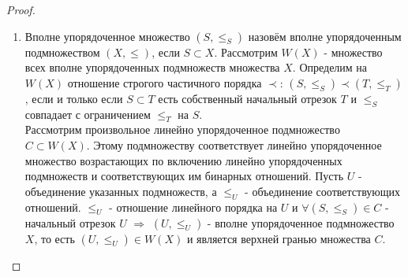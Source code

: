 \documentclass[a4paper, 12pt]{article}
\renewcommand{\phi}{\varphi}
\theoremstyle{definition}
\theoremstyle{plain}
\theoremstyle{remark}
\begin{document}
\begin{proof}
\begin{enumerate}
\begin{proof}
\begin{enumerate}
          \item Пусть $\Sigma$ - семейство корректных множеств и $U=\bigcup\Sigma$. Множество $(U,\leqslant)$ линейно упорядочено по предыдущему пункту. Каждое $S\in\Sigma$ - начальный отрезок $U$. Иначе $\exists x\in S$ и $\exists y\leqslant x$ такой, что $y\in (U\setminus S)$. Тогда для некоторого корректного $T\in\Sigma$ $y\in (T\setminus S)$, значит, $T$ не является начальным отрезком $S$. Тогда по первому утверждению $S$ - начальный отрезок $T$. Противоречие с тем, что $y\leqslant x\in S$ и $y\notin S$.\\
          Докажем, что $(U,\leqslant)$ вполне упорядочено. Пусть $Y\subset U$ не пусто, рассмотрим $y\in Y$ и корректное множество $S\in\Sigma$ такое, что $y\in S$. Поскольку $Y\cap S$ не пусто и вполне упорядочено как подмножество $S$, тогда $\exists x=\min\limits_S(Y\cap S)\in S$. Поскольку $S$ - начальный отрезок $U$, тогда $x$ - наименьший элемент $Y\subset U$.\\
          Выберем $S\in\Sigma$ такое, что $x\in S$. Так как $S$ - начальный отрезок $U$, то $U_x=S_x$ $\Longrightarrow$ $x=\phi(S_x)\phi(U_x)$. По определению $S$ корректно. Лемма доказана. 
        \end{enumerate}
      \end{proof}
      Рассмотрим множество $\Sigma$ всех корректных подмножеств множества $X$ и положим $U=\bigcup\Sigma$. По лемме $U$ вполне упорядочено и, в частности, является линейно упорядоченным множеством, то оно имеет строгую верхнюю грань $\phi(U)$. Тогда $U\cup\{\phi(U)\}$ больше $U$ и является корректным множеством, что невозможно по определению $\Sigma$. Лемма Цорна доказана.
      \item Вполне упорядоченное множество $(S, \leqslant_S)$ назовём вполне упорядоченным подмножеством $(X,\leqslant)$, если $S\subset X$. Рассмотрим $W(X)$ - множество всех вполне упорядоченных подмножеств множества $X$. Определим на $W(X)$ отношение строгого частичного порядка $\prec$: $(S,\leqslant_S)\prec(T,\leqslant_T)$, если и только если $S\subset T$ есть собственный начальный отрезок $T$ и $\leqslant_S$ совпадает с ограничением $\leqslant_T$ на $S$.\\
      Рассмотрим произвольное линейно упорядоченное подмножество $C\subset W(X)$. Этому подмножеству соответствует линейно упорядоченное множество возрастающих по включению линейно упорядоченных подмножеств и соответствующих им бинарных отношений. Пусть $U$ - объединение указанных подмножеств, а $\leqslant_U$ - объединение соответствующих отношений. $\leqslant_U$ - отношение линейного порядка на $U$ и $\forall (S,\leqslant_S)\in C$ - начальный отрезок $U$ $\Longrightarrow$ $(U,\leqslant_U)$ - вполне упорядоченное подмножество $X$, то есть $(U,\leqslant_U)\in W(X)$ и является верхней гранью множества $C$.\\

\end{enumerate}
\end{proof}
\end{document}

